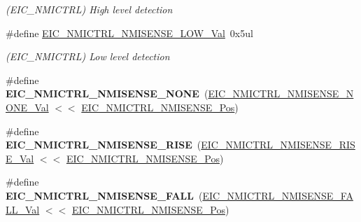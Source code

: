 \begin{DoxyCompactItemize}
\begin{DoxyCompactList}\small\item\em (E\+I\+C\+\_\+\+N\+M\+I\+C\+T\+R\+L) High level detection \end{DoxyCompactList}\item 
\hypertarget{group___s_a_m_l21___e_i_c_gaa3b9af8d6d835716ec282a17a72f7052}{}\#define \hyperlink{group___s_a_m_l21___e_i_c_gaa3b9af8d6d835716ec282a17a72f7052}{E\+I\+C\+\_\+\+N\+M\+I\+C\+T\+R\+L\+\_\+\+N\+M\+I\+S\+E\+N\+S\+E\+\_\+\+L\+O\+W\+\_\+\+Val}~0x5ul\label{group___s_a_m_l21___e_i_c_gaa3b9af8d6d835716ec282a17a72f7052}

\begin{DoxyCompactList}\small\item\em (E\+I\+C\+\_\+\+N\+M\+I\+C\+T\+R\+L) Low level detection \end{DoxyCompactList}\item 
\hypertarget{group___s_a_m_l21___e_i_c_gae353bd7582bca51ade21150774b0db04}{}\#define {\bfseries E\+I\+C\+\_\+\+N\+M\+I\+C\+T\+R\+L\+\_\+\+N\+M\+I\+S\+E\+N\+S\+E\+\_\+\+N\+O\+N\+E}~(\hyperlink{group___s_a_m_l21___e_i_c_ga0c36b33d81bd5571bc49345e2e83b9ff}{E\+I\+C\+\_\+\+N\+M\+I\+C\+T\+R\+L\+\_\+\+N\+M\+I\+S\+E\+N\+S\+E\+\_\+\+N\+O\+N\+E\+\_\+\+Val} $<$$<$ \hyperlink{group___s_a_m_l21___e_i_c_ga48859c121f51b57ddf343ba53ff169a1}{E\+I\+C\+\_\+\+N\+M\+I\+C\+T\+R\+L\+\_\+\+N\+M\+I\+S\+E\+N\+S\+E\+\_\+\+Pos})\label{group___s_a_m_l21___e_i_c_gae353bd7582bca51ade21150774b0db04}

\item 
\hypertarget{group___s_a_m_l21___e_i_c_gaa8f021b20a26f0619fac57f6ef9547e3}{}\#define {\bfseries E\+I\+C\+\_\+\+N\+M\+I\+C\+T\+R\+L\+\_\+\+N\+M\+I\+S\+E\+N\+S\+E\+\_\+\+R\+I\+S\+E}~(\hyperlink{group___s_a_m_l21___e_i_c_ga40a369ae631516099e85c14096312797}{E\+I\+C\+\_\+\+N\+M\+I\+C\+T\+R\+L\+\_\+\+N\+M\+I\+S\+E\+N\+S\+E\+\_\+\+R\+I\+S\+E\+\_\+\+Val} $<$$<$ \hyperlink{group___s_a_m_l21___e_i_c_ga48859c121f51b57ddf343ba53ff169a1}{E\+I\+C\+\_\+\+N\+M\+I\+C\+T\+R\+L\+\_\+\+N\+M\+I\+S\+E\+N\+S\+E\+\_\+\+Pos})\label{group___s_a_m_l21___e_i_c_gaa8f021b20a26f0619fac57f6ef9547e3}

\item 
\hypertarget{group___s_a_m_l21___e_i_c_gaa9b32280bacb50689c86bd21de314ae7}{}\#define {\bfseries E\+I\+C\+\_\+\+N\+M\+I\+C\+T\+R\+L\+\_\+\+N\+M\+I\+S\+E\+N\+S\+E\+\_\+\+F\+A\+L\+L}~(\hyperlink{group___s_a_m_l21___e_i_c_gaa0a05bae1746f2942044c926350f1ebe}{E\+I\+C\+\_\+\+N\+M\+I\+C\+T\+R\+L\+\_\+\+N\+M\+I\+S\+E\+N\+S\+E\+\_\+\+F\+A\+L\+L\+\_\+\+Val} $<$$<$ \hyperlink{group___s_a_m_l21___e_i_c_ga48859c121f51b57ddf343ba53ff169a1}{E\+I\+C\+\_\+\+N\+M\+I\+C\+T\+R\+L\+\_\+\+N\+M\+I\+S\+E\+N\+S\+E\+\_\+\+Pos})\label{group___s_a_m_l21___e_i_c_gaa9b32280bacb50689c86bd21de314ae7}


\end{DoxyCompactItemize}
